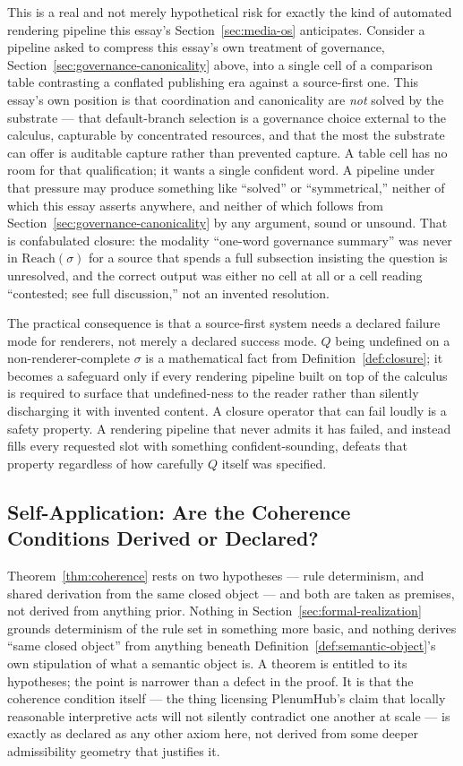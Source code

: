 \documentclass[11pt]{article}
\theoremstyle{definition}
\begin{document}
This is a real and not merely hypothetical risk for exactly the kind of automated rendering pipeline this essay's Section~\ref{sec:media-os} anticipates. Consider a pipeline asked to compress this essay's own treatment of governance, Section~\ref{sec:governance-canonicality} above, into a single cell of a comparison table contrasting a conflated publishing era against a source-first one. This essay's own position is that coordination and canonicality are \emph{not} solved by the substrate --- that default-branch selection is a governance choice external to the calculus, capturable by concentrated resources, and that the most the substrate can offer is auditable capture rather than prevented capture. A table cell has no room for that qualification; it wants a single confident word. A pipeline under that pressure may produce something like ``solved'' or ``symmetrical,'' neither of which this essay asserts anywhere, and neither of which follows from Section~\ref{sec:governance-canonicality} by any argument, sound or unsound. That is confabulated closure: the modality ``one-word governance summary'' was never in $\mathrm{Reach}(\sigma)$ for a source that spends a full subsection insisting the question is unresolved, and the correct output was either no cell at all or a cell reading ``contested; see full discussion,'' not an invented resolution.

The practical consequence is that a source-first system needs a declared failure mode for renderers, not merely a declared success mode. $Q$ being undefined on a non-renderer-complete $\sigma$ is a mathematical fact from Definition~\ref{def:closure}; it becomes a safeguard only if every rendering pipeline built on top of the calculus is required to surface that undefined-ness to the reader rather than silently discharging it with invented content. A closure operator that can fail loudly is a safety property. A rendering pipeline that never admits it has failed, and instead fills every requested slot with something confident-sounding, defeats that property regardless of how carefully $Q$ itself was specified.

\subsection{Self-Application: Are the Coherence Conditions Derived or Declared?}
\label{sec:self-application}

Theorem~\ref{thm:coherence} rests on two hypotheses --- rule determinism, and shared derivation from the same closed object --- and both are taken as premises, not derived from anything prior. Nothing in Section~\ref{sec:formal-realization} grounds determinism of the rule set in something more basic, and nothing derives ``same closed object'' from anything beneath Definition~\ref{def:semantic-object}'s own stipulation of what a semantic object is. A theorem is entitled to its hypotheses; the point is narrower than a defect in the proof. It is that the coherence condition itself --- the thing licensing PlenumHub's claim that locally reasonable interpretive acts will not silently contradict one another at scale --- is exactly as declared as any other axiom here, not derived from some deeper admissibility geometry that justifies it.
\end{document}
